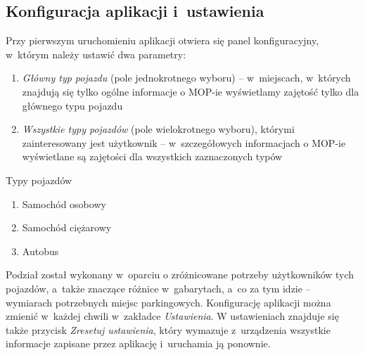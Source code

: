 \subsection{Konfiguracja aplikacji i~ustawienia}
Przy pierwszym uruchomieniu aplikacji otwiera się panel konfiguracyjny, w~którym należy ustawić dwa parametry:
\begin{enumerate}
\item \textit{Główny typ pojazdu} (pole jednokrotnego wyboru) -- w~miejscach, w~których znajdują się tylko ogólne informacje o MOP-ie wyświetlamy zajętość tylko dla głównego typu pojazdu
\item \textit{Wszystkie typy pojazdów} (pole wielokrotnego wyboru), którymi zainteresowany jest użytkownik -- w~szczegółowych informacjach o MOP-ie wyświetlane są zajętości dla wszystkich zaznaczonych typów
\end{enumerate}
Typy pojazdów
\begin{enumerate}
\item Samochód osobowy
\item Samochód ciężarowy
\item Autobus
\end{enumerate}
Podział został wykonany w~oparciu o zróżnicowane potrzeby użytkowników tych pojazdów, a~także znaczące różnice w~gabarytach, a~co za tym idzie -- wymiarach potrzebnych miejsc parkingowych.
Konfigurację aplikacji można zmienić w~każdej chwili w~zakładce \emph{Ustawienia}.
W ustawieniach znajduje się także przycisk \textit{Zresetuj ustawienia}, który wymazuje z~urządzenia wszystkie informacje zapisane przez aplikację i~uruchamia ją ponownie. 

